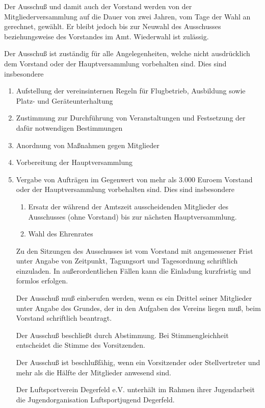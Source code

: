 \documentclass[10pt,a4paper,parskip=half]{scrartcl}
\begin{document}
\begin{contract}
\begin{multicols}{2}
\begin{enumerate}[label=\alph*),noitemsep]
    Der Ausschuß und damit auch der Vorstand werden von der Mitgliederversammlung auf die Dauer von zwei Jahren,
    vom Tage der Wahl an gerechnet, gewählt.
    Er bleibt jedoch bis zur Neuwahl des Ausschusses beziehungsweise des Vorstandes im Amt.
    Wiederwahl ist zulässig.
    
    Der Ausschuß ist zuständig für alle Angelegenheiten,
    welche nicht ausdrücklich dem Vorstand oder der Hauptversammlung vorbehalten sind.
    Dies sind insbesondere
    \begin{enumerate}[label=\alph*),noitemsep]
      \item Aufstellung der vereinsinternen Regeln für Flugbetrieb,
            Ausbildung sowie Platz- und Geräteunterhaltung
      \item Zustimmung zur Durchführung von Veranstaltungen und Festsetzung der dafür notwendigen Bestimmungen
      \item Anordnung von Maßnahmen gegen Mitglieder
      \item Vorbereitung der Hauptversammlung
      \item Vergabe von Aufträgen im Gegenwert von mehr als 3.000 Euroem Vorstand oder der Hauptversammlung vorbehalten sind.
      Dies sind insbesondere
      \begin{enumerate}[label=\alph*),noitemsep]
      \item Ersatz der während der Amtszeit ausscheidenden Mitglieder des Ausschusses (ohne Vorstand) bis zur nächsten Hauptversammlung.
      \item Wahl des Ehrenrates
    \end{enumerate}
    
    Zu den Sitzungen des Ausschusses ist vom Vorstand mit angemessener Frist unter Angabe von Zeitpunkt,
    Tagungsort und Tagesordnung schriftlich einzuladen.
    In außerordentlichen Fällen kann die Einladung kurzfristig und formlos erfolgen.
    
    Der Ausschuß muß einberufen werden,
    wenn es ein Drittel seiner Mitglieder unter Angabe des Grundes,
    der in den Aufgaben des Vereins liegen muß,
    beim Vorstand schriftlich beantragt.
    
    Der Ausschuß beschließt durch Abstimmung.
    Bei Stimmengleichheit entscheidet die Stimme des Vorsitzenden.
    
    Der Ausschuß ist beschlußfähig,
    wenn ein Vorsitzender oder Stellvertreter und mehr als die Hälfte der Mitglieder anwesend sind.
    
    Der Luftsportverein Degerfeld e.V. unterhält im Rahmen ihrer Jugendarbeit die Jugendorganisation Luftsportjugend Degerfeld.
    

\end{enumerate}
\end{enumerate}
\end{multicols}
\end{contract}
\end{document}
